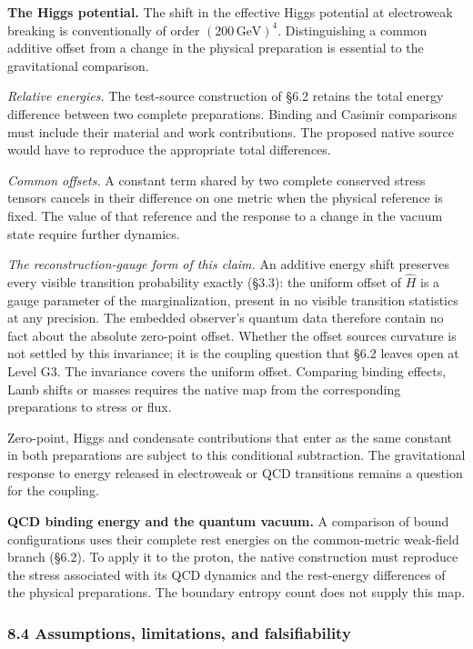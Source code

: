 \documentclass[
]{article}
\begin{document}
\textbf{The Higgs potential.} The shift in the effective Higgs potential
at electroweak breaking is conventionally of order
\((200\,\mathrm{GeV})^4\). Distinguishing a common additive offset from
a change in the physical preparation is essential to the gravitational
comparison.

\emph{Relative energies.} The test-source construction of §6.2 retains
the total energy difference between two complete preparations. Binding
and Casimir comparisons must include their material and work
contributions. The proposed native source would have to reproduce the
appropriate total differences.

\emph{Common offsets.} A constant term shared by two complete conserved
stress tensors cancels in their difference on one metric when the
physical reference is fixed. The value of that reference and the
response to a change in the vacuum state require further dynamics.

\emph{The reconstruction-gauge form of this claim.} An additive energy
shift preserves every visible transition probability exactly (§3.3): the
uniform offset of \(\hat H\) is a gauge parameter of the
marginalization, present in no visible transition statistics at any
precision. The embedded observer's quantum data therefore contain no
fact about the absolute zero-point offset. Whether the offset sources
curvature is not settled by this invariance; it is the coupling question
that §6.2 leaves open at Level G3. The invariance covers the uniform
offset. Comparing binding effects, Lamb shifts or masses requires the
native map from the corresponding preparations to stress or flux.

Zero-point, Higgs and condensate contributions that enter as the same
constant in both preparations are subject to this conditional
subtraction. The gravitational response to energy released in
electroweak or QCD transitions remains a question for the coupling.

\textbf{QCD binding energy and the quantum vacuum.} A comparison of
bound configurations uses their complete rest energies on the
common-metric weak-field branch (§6.2). To apply it to the proton, the
native construction must reproduce the stress associated with its QCD
dynamics and the rest-energy differences of the physical preparations.
The boundary entropy count does not supply this map.

\hypertarget{assumptions-limitations-and-falsifiability}{%
\subsubsection{8.4 Assumptions, limitations, and
falsifiability}\label{assumptions-limitations-and-falsifiability}}
\end{document}
